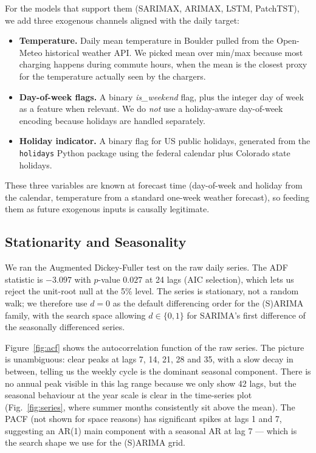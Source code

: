 For the models that support them (SARIMAX, ARIMAX, LSTM, PatchTST), we
add three exogenous channels aligned with the daily target:
\begin{itemize}[leftmargin=*]
    \item \textbf{Temperature.} Daily mean temperature in Boulder
    pulled from the Open-Meteo historical weather API. We picked mean
    over min/max because most charging happens during commute hours,
    when the mean is the closest proxy for the temperature actually
    seen by the chargers.
    \item \textbf{Day-of-week flags.} A binary \emph{is\_weekend}
    flag, plus the integer day of week as a feature when relevant. We
    do \emph{not} use a holiday-aware day-of-week encoding because
    holidays are handled separately.
    \item \textbf{Holiday indicator.} A binary flag for US public
    holidays, generated from the \texttt{holidays} Python package
    using the federal calendar plus Colorado state holidays.
\end{itemize}
These three variables are known at forecast time (day-of-week and
holiday from the calendar, temperature from a standard one-week
weather forecast), so feeding them as future exogenous inputs is
causally legitimate.

\subsection{Stationarity and Seasonality}

We ran the Augmented Dickey-Fuller test on the raw daily series. The
ADF statistic is $-3.097$ with $p$-value $0.027$ at 24 lags (AIC
selection), which lets us reject the unit-root null at the 5\% level.
The series is stationary, not a random walk; we therefore use $d=0$
as the default differencing order for the (S)ARIMA family, with the
search space allowing $d \in \{0,1\}$ for SARIMA's first difference of
the seasonally differenced series.

Figure~\ref{fig:acf} shows the autocorrelation function of the raw
series. The picture is unambiguous: clear peaks at lags 7, 14, 21, 28
and 35, with a slow decay in between, telling us the weekly cycle is
the dominant seasonal component. There is no annual peak visible in
this lag range because we only show 42 lags, but the seasonal
behaviour at the year scale is clear in the time-series plot
(Fig.~\ref{fig:series}, where summer months consistently sit above
the mean). The PACF (not shown for space reasons) has significant
spikes at lags 1 and 7, suggesting an AR(1) main component with a
seasonal AR at lag 7 --- which is the search shape we use for the
(S)ARIMA grid.

